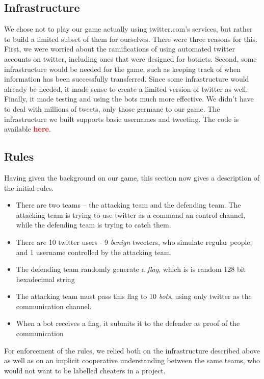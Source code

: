\documentclass[11pt, oneside]{article} %
\numberwithin{equation}{section} %
\numberwithin{figure}{section} %
\numberwithin{table}{section} %
\newcommand\todo[1]{\textbf{\textcolor{red}{#1}}}
\begin{document}
	\subsection{Infrastructure}
		We chose not to play our game actually using twitter.com's services,
		but rather to build a limited subset of them for ourselves. There were
		three reasons for this. First, we were worried about the ramifications
		of using automated twitter accounts on twitter, including ones
		that were designed for botnets.
		Second, some infrastructure would be needed for the game, such as
		keeping track of when information has been successfully transferred. Since some infrastructure
		would already be needed, it made sense to create a limited version of twitter as well.
		Finally, it made testing and using the bots much more effective. We didn't have
		to deal with millions of tweets, only those germane to our game.
		The infrastructure we built supports basic usernames and tweeting.
		The code is available \todo{here}.

	\subsection{Rules}
		Having given the background on our game, this section now gives a description
		of the initial rules.
		\begin{itemize}
		 \item There are two teams -- the attacking team and the defending team. The attacking
		 	team is trying to use twitter as a command an control channel, while the defending
			team is trying to catch them.
		 \item There are 10 twitter users - 9 \textit{benign} tweeters, who simulate regular people,
		 	and 1 username controlled by the attacking team.
		 \item The defending team randomly generate a \textit{flag}, which is is random 128 bit
			hexadecimal string
		 \item The attacking team must pass this flag to 10 \textit{bots}, using only twitter
		 	as the communication channel.
		\item When a bot receives a flag, it submits it to the defender as proof of the communication
		\end{itemize}

		For enforcement of the rules, we relied both on the infrastructure described above as well
		as on an implicit cooperative understanding between the same teams, who would not want to
		be labelled cheaters in a project.
\end{document}
